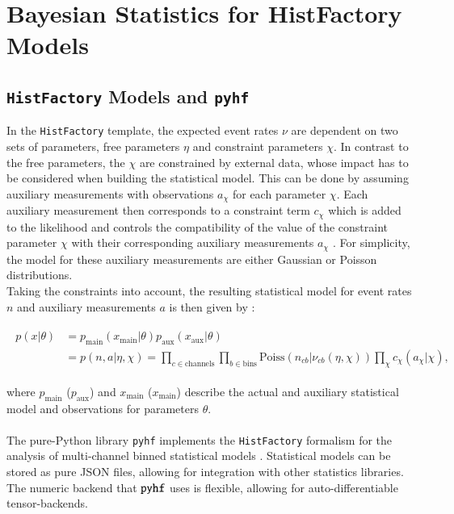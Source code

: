\section{Bayesian Statistics for HistFactory Models} \label{BayesForpyhf}


\subsection{\texttt{HistFactory} Models and \texttt{pyhf}} \label{subsec:HFandpyhf}

In the \texttt{HistFactory} template, the expected event rates $\nu$ are dependent on two sets of parameters, free parameters $\eta$ and constraint parameters $\chi$. In contrast to the free parameters, the $\chi$ are constrained by external data, whose impact has to be considered when building the statistical model. This can be done by assuming auxiliary measurements with observations $a_{\chi}$ for each parameter $\chi$. Each auxiliary measurement then corresponds to a constraint term  $c_{\chi}$ which is added to the likelihood and controls the compatibility of the value of the constraint parameter $\chi$ with their corresponding auxiliary measurements $a_{\chi}$ \cite{pyhf, pyhf_joss, Cranmer:1456844}. For simplicity, the model for these auxiliary measurements are either Gaussian or Poisson distributions. \\
Taking the constraints into account, the resulting statistical model for event rates $n$ and auxiliary measurements $a$ is then given by \cite{pyhf, pyhf_joss}:

    \begin{align}
    \begin{split}
        p(x | \theta ) &= p_{\text{main}} (x_{\text{main}}| \theta ) p_{\text{aux}} (x_{\text{aux}}| \theta) \\
         &= p( n, a | \eta, \chi) = \prod_{c \in \text{channels}}  \prod_{b \in \text{bins}} \text{Poiss}(n_{cb} | \nu_{cb}(\eta, \chi)) \prod_{\chi}c_{\chi}(a_{\chi} | \chi),
    \end{split}
    \end{align}

\noindent where $p_{\text{main}}$ ($p_{\text{aux}}$) and $x_{\text{main}}$ ($x_{\text{main}}$) describe the actual and auxiliary statistical model and observations for parameters $\theta$. \\ \\ 
\noindent The pure-Python library \texttt{pyhf} implements the \texttt{HistFactory} formalism for the analysis of multi-channel binned statistical models \cite{pyhf, pyhf_joss}. Statistical models can be stored as pure JSON files, allowing for integration with other statistics libraries. The numeric backend that $\texttt{pyhf}$ uses is flexible, allowing for auto-differentiable tensor-backends.


